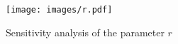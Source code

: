 \begin{figure}[!ht]
\centering
\texttt{[image: images/r.pdf]}
\caption{\small Sensitivity analysis of the parameter $r$}
\label{fig:r}
\end{figure}